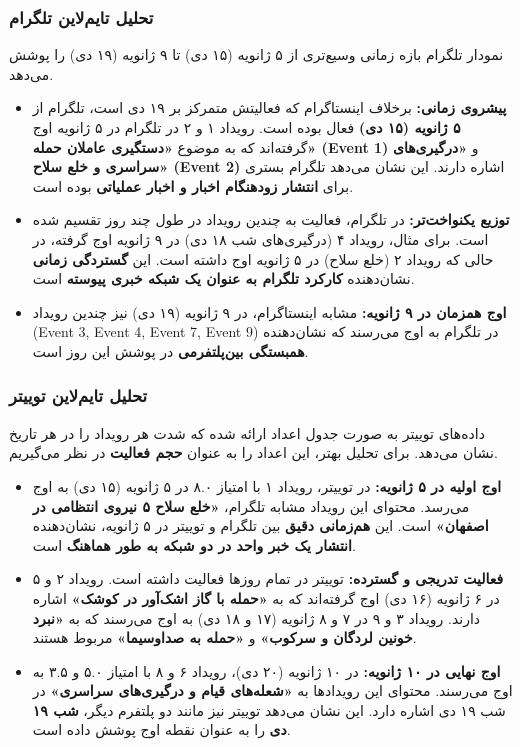 \documentclass{article}
\begin{document}
\subsubsection{تحلیل تایم‌لاین تلگرام}
نمودار تلگرام بازه زمانی وسیع‌تری از ۵ ژانویه (۱۵ دی) تا ۹ ژانویه (۱۹ دی) را پوشش می‌دهد.

\begin{itemize}
	\item \textbf{پیشروی زمانی:} برخلاف اینستاگرام که فعالیتش متمرکز بر ۱۹ دی است، تلگرام از \textbf{۵ ژانویه (۱۵ دی)} فعال بوده است. رویداد ۱ و ۲ در تلگرام در ۵ ژانویه اوج گرفته‌اند که به موضوع \textbf{«دستگیری عاملان حمله» (Event 1)} و \textbf{«درگیری‌های سراسری و خلع سلاح» (Event 2)} اشاره دارند. این نشان می‌دهد تلگرام بستری برای \textbf{انتشار زودهنگام اخبار و اخبار عملیاتی} بوده است.
	\item \textbf{توزیع یکنواخت‌تر:} در تلگرام، فعالیت به چندین رویداد در طول چند روز تقسیم شده است. برای مثال، رویداد ۴ (درگیری‌های شب ۱۸ دی) در ۹ ژانویه اوج گرفته، در حالی که رویداد ۲ (خلع سلاح) در ۵ ژانویه اوج داشته است. این \textbf{گستردگی زمانی} نشان‌دهنده \textbf{کارکرد تلگرام به عنوان یک شبکه خبری پیوسته} است.
	\item \textbf{اوج همزمان در ۹ ژانویه:} مشابه اینستاگرام، در ۹ ژانویه (۱۹ دی) نیز چندین رویداد (Event 3, Event 4, Event 7, Event 9) در تلگرام به اوج می‌رسند که نشان‌دهنده \textbf{همبستگی بین‌پلتفرمی} در پوشش این روز است.
\end{itemize}

\subsubsection{تحلیل تایم‌لاین توییتر}
داده‌های توییتر به صورت جدول اعداد ارائه شده که شدت هر رویداد را در هر تاریخ نشان می‌دهد. برای تحلیل بهتر، این اعداد را به عنوان \textbf{حجم فعالیت} در نظر می‌گیریم.

\begin{itemize}
	\item \textbf{اوج اولیه در ۵ ژانویه:} در توییتر، رویداد ۱ با امتیاز ۸.۰ در ۵ ژانویه (۱۵ دی) به اوج می‌رسد. محتوای این رویداد مشابه تلگرام، \textbf{«خلع سلاح ۵ نیروی انتظامی در اصفهان»} است. این \textbf{هم‌زمانی دقیق} بین تلگرام و توییتر در ۵ ژانویه، نشان‌دهنده \textbf{انتشار یک خبر واحد در دو شبکه به طور هماهنگ} است.
	\item \textbf{فعالیت تدریجی و گسترده:} توییتر در تمام روزها فعالیت داشته است. رویداد ۲ و ۵ در ۶ ژانویه (۱۶ دی) اوج گرفته‌اند که به \textbf{«حمله با گاز اشک‌آور در کوشک»} اشاره دارند. رویداد ۳ و ۹ در ۷ و ۸ ژانویه (۱۷ و ۱۸ دی) به اوج می‌رسند که به \textbf{«نبرد خونین لردگان و سرکوب»} و \textbf{«حمله به صداوسیما»} مربوط هستند.
	\item \textbf{اوج نهایی در ۱۰ ژانویه:} در ۱۰ ژانویه (۲۰ دی)، رویداد ۶ و ۸ با امتیاز ۵.۰ و ۳.۵ به اوج می‌رسند. محتوای این رویدادها به \textbf{«شعله‌های قیام و درگیری‌های سراسری»} در شب ۱۹ دی اشاره دارد. این نشان می‌دهد توییتر نیز مانند دو پلتفرم دیگر، \textbf{شب ۱۹ دی} را به عنوان نقطه اوج پوشش داده است.
\end{itemize}
\end{document}
